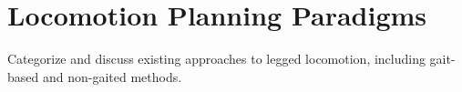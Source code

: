 \section{Locomotion Planning Paradigms}

\begin{outline}
  Categorize and discuss existing approaches to legged locomotion,
  including gait-based and non-gaited methods.
\end{outline}
